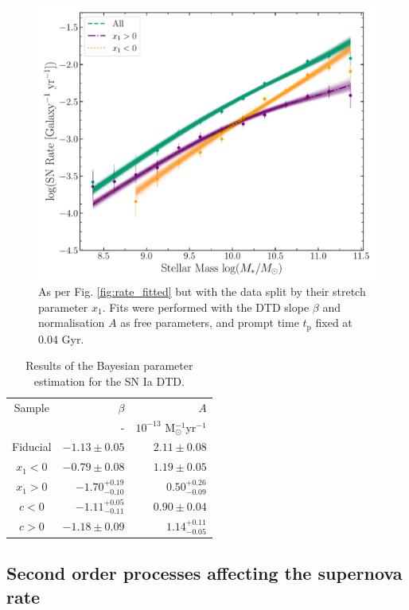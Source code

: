 \documentclass[fleqn,usenatbib]{mnras}
\begin{document}
\begin{figure}
    \centering
    \includegraphics[width=.5\textwidth]{figs/rate_vs_mass_DTD_fit_beta_norm_Qerf1.1_split_x1.pdf}
    \caption{As per Fig. \ref{fig:rate_fitted} but with the data split by their stretch parameter $x_1$. Fits were performed with the DTD slope $\beta$ and normalisation $A$ as free parameters, and prompt time $t_{\mathrm{p}}$ fixed at 0.04 Gyr.%
    \label{fig:rate_fitted_split_x1}}
\end{figure}

\renewcommand{\arraystretch}{1.2}
\begin{table}
	\centering
	\caption{Results of the Bayesian parameter estimation for the SN Ia DTD.}
	\label{tab:dtd_results_split_lc}
	\begin{tabular}{crr} %
		\hline
		 Sample &$\beta$ & $A$ \\
		 &-       & $10^{-13}$ M$_{\odot}^{-1}$yr$^{-1}$ \\
		\hline
		Fiducial & $-1.13\pm0.05$ &  $2.11\pm0.08$ \\
	    $x_1 < 0$ & $-0.79\pm0.08$ &  $1.19 \pm0.05$ \\
		$x_1 > 0$ & $-1.70^{+0.19}_{-0.10}$ & $0.50^{+0.26}_{-0.09}$ \\
		$c < 0$ & $-1.11^{+0.05}_{-0.11}$ & $0.90\pm0.04$ \\
		$c > 0$ & $-1.18\pm0.09$ & $1.14^{+0.11}_{-0.05}$ \\
		\hline
	\end{tabular}
\end{table}
\subsection{Second order processes affecting the supernova rate \label{subsec:discussion}}
\end{document}
